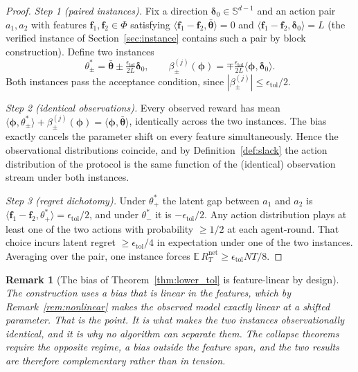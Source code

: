 \documentclass[11pt]{article}
\newtheorem{remark}[theorem]{Remark}
\begin{document}
\begin{proof}
\emph{Step 1 (paired instances).}  Fix a direction
$\bm\delta_0\in\mathbb S^{d-1}$ and an action pair $a_1,a_2$ with
features $\bm f_1,\bm f_2\in\Phi$ satisfying
$\langle\bm f_1-\bm f_2,\bar{\bm\theta}\rangle=0$ and
$\langle\bm f_1-\bm f_2,\bm\delta_0\rangle=L$
(the verified instance of Section~\ref{sec:instance} contains such a
pair by block construction).  Define two instances
\[
\theta^*_\pm=\bar{\bm\theta}\pm\tfrac{\epsilon_{\mathrm{tol}}}{2L}\bm\delta_0,
\qquad
\beta^{(j)}_\pm(\bm\phi)
=\mp\tfrac{\epsilon_{\mathrm{tol}}}{2L}\langle\bm\phi,\bm\delta_0\rangle .
\]
Both instances pass the acceptance condition, since
$|\beta^{(j)}_\pm|\leq\epsilon_{\mathrm{tol}}/2$.

\emph{Step 2 (identical observations).}  Every observed reward has
mean
$\langle\bm\phi,\theta^*_\pm\rangle+\beta^{(j)}_\pm(\bm\phi)
=\langle\bm\phi,\bar{\bm\theta}\rangle$,
identically across the two instances. The bias exactly cancels the
parameter shift on every feature simultaneously.  Hence the
observational distributions coincide, and by
Definition~\ref{def:slack} the action distribution of the protocol is
the same function of the (identical) observation stream under both
instances.

\emph{Step 3 (regret dichotomy).}  Under $\theta^*_+$ the latent gap
between $a_1$ and $a_2$ is
$\langle\bm f_1-\bm f_2,\theta^*_+\rangle=\epsilon_{\mathrm{tol}}/2$,
and under $\theta^*_-$ it is $-\epsilon_{\mathrm{tol}}/2$.  Any action
distribution plays at least one of the two actions with probability
$\geq 1/2$ at each agent-round. That choice incurs latent regret
$\geq\epsilon_{\mathrm{tol}}/4$ in expectation under one of the two
instances.  Averaging over the pair, one instance forces
$\mathbb E\,R_T^{\mathrm{net}}\geq\epsilon_{\mathrm{tol}}NT/8$.
\qedhere
\end{proof}

\begin{remark}[The bias of Theorem~\ref{thm:lower_tol} is
feature-linear by design]\label{rem:tol_linear}
The construction uses a bias that is linear in the features, which by
Remark~\ref{rem:nonlinear} makes the observed model exactly linear at
a shifted parameter. That is the point. It is what makes the two
instances observationally identical, and it is why no algorithm can
separate them.  The collapse theorems require the opposite regime, a
bias outside the feature span, and the two results are therefore
complementary rather than in tension.
\end{remark}
\end{document}
